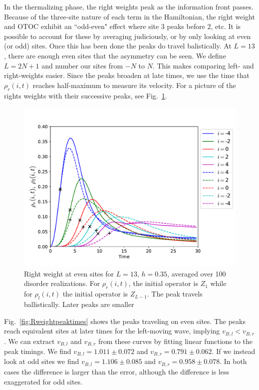\documentclass[aps,prx,reprint,superscriptaddress, longbibliography]{revtex4-1}
\newcommand{\charlie}[1]{{\color{Magenta}{{#1}}}}
\begin{document}
In the thermalizing phase, the right weights peak as the information front passes. Because of the three-site nature of each term in the Hamiltonian, the right weight and OTOC exhibit an ``odd-even" effect where site 3 peaks before 2, etc. It is possible to account for these by averaging judiciously, or by only looking at even (or odd) sites. Once this has been done the peaks do travel balistically. At $L=13$, there are enough even sites that the asymmetry can be seen. We define $L=2N+1$ and number our sites from $-N$ to $N$. This makes comparing left- and right-weights easier. Since the peaks broaden at late times, we use the time that $\rho_r(i,t)$ reaches half-maximum to measure its velocity.
For a picture of the rights weights with their successive peaks, see Fig.~\ref{fig:Rweightpeakshape}.

\begin{figure}
	\includegraphics[width=\columnwidth]{Rweightpeakshape}
	\caption{Right weight at even sites for $L=13$, $h=0.35$, averaged over 100 disorder realizations. For $\rho_r(i,t)$, the initial operator is $Z_1$ while for $\rho_l(i,t)$ the initial operator is $Z_{L-1}$. The peak travels ballistically. Later peaks are smaller \charlie{Is this due to broadening?}}
	\label{fig:Rweightpeakshape}
\end{figure}

Fig.~\ref{fig:Rweightpeaktimes} shows the peaks traveling on even sites. The peaks reach equivalent sites at later times for the left-moving wave, implying $v_{B,l}<v_{B,r}$. We can extract $v_{B,l}$ and $v_{B,r}$ from these curves by fitting linear functions to the peak timings. We find $v_{B,l}=1.011 \pm 0.072$ and $v_{B,r}=0.791 \pm 0.062$. If we instead look at odd sites we find $v_{B,l}=1.106 \pm 0.085$ and $v_{B,r}=0.958 \pm 0.078$. In both cases the difference is larger than the error, although the difference is less exaggerated for odd sites.
\end{document}
